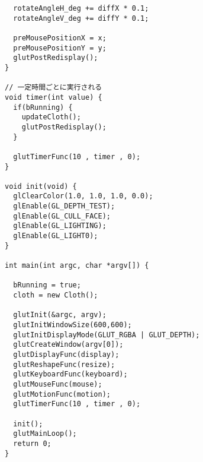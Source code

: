 \documentclass{scrartcl}
\begin{document}
\begin{verbatim}
  rotateAngleH_deg += diffX * 0.1;
  rotateAngleV_deg += diffY * 0.1;

  preMousePositionX = x;
  preMousePositionY = y;
  glutPostRedisplay();
}

// 一定時間ごとに実行される
void timer(int value) {
  if(bRunning) {
    updateCloth();
    glutPostRedisplay();
  }

  glutTimerFunc(10 , timer , 0);
}

void init(void) {
  glClearColor(1.0, 1.0, 1.0, 0.0);
  glEnable(GL_DEPTH_TEST);
  glEnable(GL_CULL_FACE);
  glEnable(GL_LIGHTING);
  glEnable(GL_LIGHT0);
}

int main(int argc, char *argv[]) {

  bRunning = true;
  cloth = new Cloth();

  glutInit(&argc, argv);
  glutInitWindowSize(600,600);
  glutInitDisplayMode(GLUT_RGBA | GLUT_DEPTH);
  glutCreateWindow(argv[0]);
  glutDisplayFunc(display);
  glutReshapeFunc(resize);
  glutKeyboardFunc(keyboard);
  glutMouseFunc(mouse);
  glutMotionFunc(motion);
  glutTimerFunc(10 , timer , 0);

  init();
  glutMainLoop();
  return 0;
}
\end{verbatim}
\end{document}
